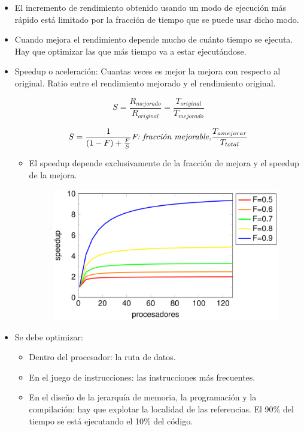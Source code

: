\documentclass[12pt, twoside, openright]{report} %
\begin{document}
  \begin{itemize}
  
  \item
    El incremento de rendimiento obtenido usando un modo de ejecución
    más rápido está limitado por la fracción de tiempo que se puede usar
    dicho modo.
  \item
    Cuando mejora el rendimiento depende mucho de cuánto tiempo se
    ejecuta. Hay que optimizar las que más tiempo va a estar
    ejecutándose.
  \item
    Speedup o aceleración: Cuantas veces es mejor la mejora con respecto
    al original. Ratio entre el rendimiento mejorado y el rendimiento
    original.


    $$S=\frac {R_{mejorado}} {R_{original}}=\frac {T_{original}} {T_{mejorado}}$$

    $$S=\frac 1 {(1-F)+\frac F S} \textit{F: fracción mejorable,}
    \frac {T_{a\space mejorar}} {T_{total}}$$

    \begin{itemize}
    \item
      El speedup depende exclusivamente de la fracción de mejora y el
      speedup de la mejora.
      \begin{figure}[H]
        {\includegraphics[scale=.26]{Untitled 7.png}}
      \end{figure}
    \end{itemize}
  \item
    Se debe optimizar:

    \begin{itemize}
    
    \item
      Dentro del procesador: la ruta de datos.
    \item
      En el juego de instrucciones: las instrucciones más frecuentes.
    \item
      En el diseño de la jerarquía de memoria, la programación y la
      compilación: hay que explotar la localidad de las referencias. El
      90\% del tiempo se está ejecutando el 10\% del código.
    \end{itemize}
  \end{itemize}
\end{document}
